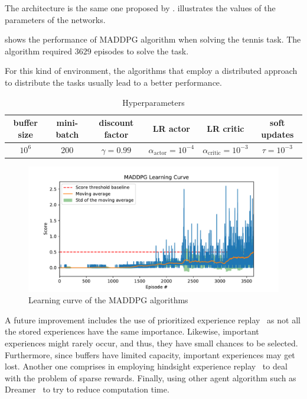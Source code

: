 \documentclass[12pt,english]{article}
\begin{document}
The architecture is the same one proposed by \citeauthor{lillicrap:16}\cite{lillicrap:16}.  illustrates the values of the parameters of the networks. 

 shows the performance of MADDPG algorithm when solving the tennis task. The algorithm required \(3629\) episodes to solve the task.

For this kind of environment, the algorithms that employ a distributed approach to distribute the tasks usually lead to a better performance.

\begin{table}
\footnotesize
{
  \caption{Hyperparameters}\label{tb:parameters}
  \centering
  \begin{tabular}{cccccc}
  \toprule
    \textbf{buffer size} & \textbf{mini-batch} & \textbf{discount factor} & \textbf{LR actor} & \textbf{LR critic} & \textbf{soft updates}\\
  \midrule
   \(10^6\) & 200 & \(\gamma = 0.99\) & \(\alpha_{\text{actor}} = 10^{-4}\) & \(\alpha_{\text{critic}} = 10^{-3}\) & \(\tau=10^{-3}\)\\
  \bottomrule
  \end{tabular}
}
\end{table}

\begin{figure}%
    \centering
    \includegraphics[width=\textwidth]{maddpg_score}
    \caption{Learning curve of the MADDPG algorithms}\label{fig:score}
\end{figure}

A future improvement includes the use of prioritized experience replay~\cite{schaul:15} as not all the stored experiences have the same importance. Likewise, important experiences might rarely occur, and thus, they have small chances to be selected. Furthermore, since buffers have limited capacity, important experiences may get lost. Another one comprises in employing hindsight experience replay~\cite{andrychowicz:17} to deal with the problem of sparse rewards. Finally, using other agent algorithm such as Dreamer~\cite{hafner:20} to try to reduce computation time. 



\end{document}
